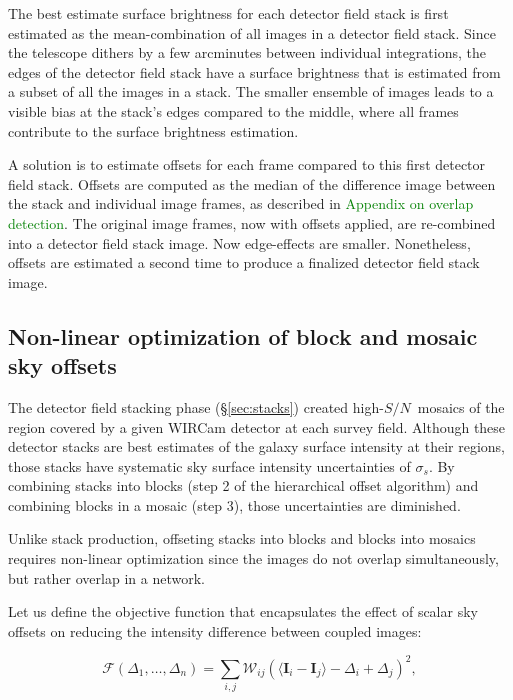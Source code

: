 \documentclass[iop]{emulateapj}
\newcommand{\vect}[1]{\boldsymbol{#1}} %
\newcommand{\sn}{\ensuremath{S/N}} %
\newcommand{\todo}[1]{\textcolor{green}{#1}}
\begin{document}
The best estimate surface brightness for each detector field stack is first estimated as the mean-combination of all images in a detector field stack.  Since the telescope dithers by a few arcminutes between individual integrations, the edges of the detector field stack have a surface brightness that is estimated from a subset of all the images in a stack. The smaller ensemble of images leads to a visible bias at the stack's edges compared to the middle, where all frames contribute to the surface brightness estimation.

A solution is to estimate offsets for each frame compared to this first detector field stack. Offsets are computed as the median of the difference image between the stack and individual image frames, as described in \todo{Appendix on overlap detection}. The original image frames, now with offsets applied, are re-combined into a detector field stack image. Now edge-effects are smaller. Nonetheless, offsets are estimated a second time to produce a finalized detector field stack image.

\subsection{Non-linear optimization of block and mosaic sky offsets}

The detector field stacking phase (\S \ref{sec:stacks}) created high-\sn\ mosaics of the region covered by a given WIRCam detector at each survey field. Although these detector stacks are best estimates of the galaxy surface intensity at their regions, those stacks have systematic sky surface intensity uncertainties of $\sigma_s$. By combining stacks into blocks (step 2 of the hierarchical offset algorithm) and combining blocks in a mosaic (step 3), those uncertainties are diminished.

Unlike stack production, offseting stacks into blocks and blocks into mosaics requires non-linear optimization since the images do not overlap simultaneously, but rather overlap in a network.

Let us define the objective function that encapsulates the effect of scalar sky offsets on reducing the intensity difference between coupled images:

\begin{equation}
    \mathcal{F} \left(\Delta_1,\ldots,\Delta_n \right) = \sum_{i,j} \mathcal{W}_{ij} \left( \langle \vect{I}_i - \vect{I}_j \rangle - \Delta_i + \Delta_j \right)^2,
    \label{eq:objf}
\end{equation}
\end{document}
